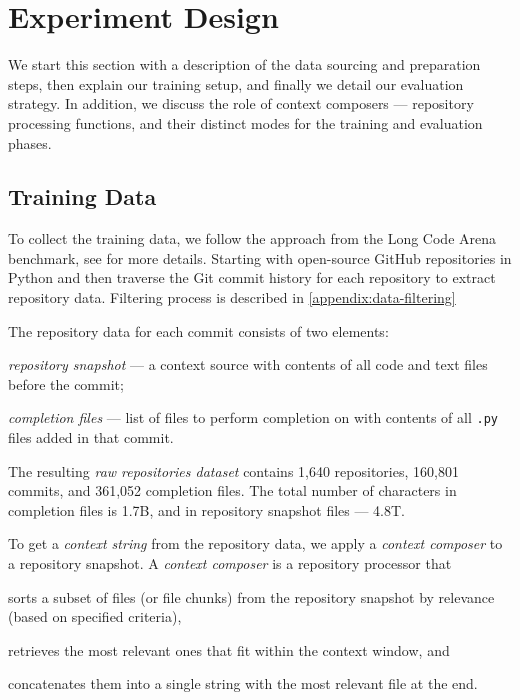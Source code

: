 \section{Experiment Design}
We start this section with a description of the data sourcing and preparation steps, then explain our training setup, and finally we detail our evaluation strategy. In addition, we discuss the role of context composers --- repository processing functions, and their distinct modes for the training and evaluation phases.


\subsection{Training Data}
\label{paper:data}
To collect the training data, we follow the approach from the Long Code Arena benchmark, see \citet{LCA} for more details. Starting with open-source GitHub repositories in Python and then traverse the Git commit history for each repository to extract repository data. Filtering process is described in \ref{appendix:data-filtering}

The repository data for each commit consists of two elements:
\begin{inparaenum}[(1)]
    \item \textit{repository snapshot} --- a context source with contents of all code and text files before the commit;
    \item \textit{completion files} --- list of files to perform completion on with contents of all \texttt{.py} files added in that commit.
\end{inparaenum}

The resulting \textit{raw repositories dataset} contains 1,640 repositories, 160,801 commits, and 361,052 completion files. 
The total number of characters in completion files is 1.7B, and in repository snapshot files --- 4.8T.

To get a \textit{context string} from the repository data, we apply a \textit{context composer} to a repository snapshot. A \textit{context composer} is a repository processor that \begin{inparaenum}[(1)]
\item sorts a subset of files (or file chunks) from the repository snapshot by relevance (based on specified criteria),
\item retrieves the most relevant ones that fit within the context window, and 
\item concatenates them into a single string with the most relevant file at the end.
\end{inparaenum}

